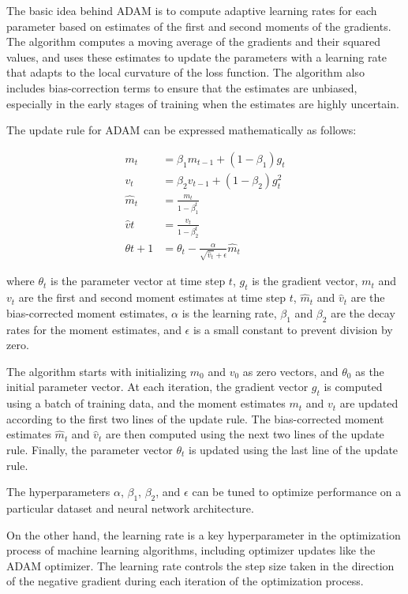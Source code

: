 The basic idea behind ADAM is to compute adaptive learning rates for each parameter based on estimates of the first and second moments of the gradients. The algorithm computes a moving average of the gradients and their squared values, and uses these estimates to update the parameters with a learning rate that adapts to the local curvature of the loss function. The algorithm also includes bias-correction terms to ensure that the estimates are unbiased, especially in the early stages of training when the estimates are highly uncertain.

The update rule for ADAM can be expressed mathematically as follows:

\begin{equation}
\begin{split}
	m_t &= \beta_1 m_{t-1} + (1-\beta_1) g_t \\
	v_t &= \beta_2 v_{t-1} + (1-\beta_2) g_t^2 \\
	\hat{m}_t &= \frac{m_t}{1-\beta_1^t} \\
	\hat{v}t &= \frac{v_t}{1-\beta_2^t} \\
	\theta{t+1} &= \theta_t - \frac{\alpha}{\sqrt{\hat{v}_t}+\epsilon} \hat{m}_t
\end{split}
\end{equation}

where $\theta_t$ is the parameter vector at time step $t$, $g_t$ is the gradient vector, $m_t$ and $v_t$ are the first and second moment estimates at time step $t$, $\hat{m}_t$ and $\hat{v}_t$ are the bias-corrected moment estimates, $\alpha$ is the learning rate, $\beta_1$ and $\beta_2$ are the decay rates for the moment estimates, and $\epsilon$ is a small constant to prevent division by zero.

The algorithm starts with initializing $m_0$ and $v_0$ as zero vectors, and $\theta_0$ as the initial parameter vector. At each iteration, the gradient vector $g_t$ is computed using a batch of training data, and the moment estimates $m_t$ and $v_t$ are updated according to the first two lines of the update rule. The bias-corrected moment estimates $\hat{m}_t$ and $\hat{v}_t$ are then computed using the next two lines of the update rule. Finally, the parameter vector $\theta_t$ is updated using the last line of the update rule.

The hyperparameters $\alpha$, $\beta_1$, $\beta_2$, and $\epsilon$ can be tuned to optimize performance on a particular dataset and neural network architecture.

On the other hand, the learning rate is a key hyperparameter in the optimization process of machine learning algorithms, including optimizer updates like the ADAM optimizer. The learning rate controls the step size taken in the direction of the negative gradient during each iteration of the optimization process.

